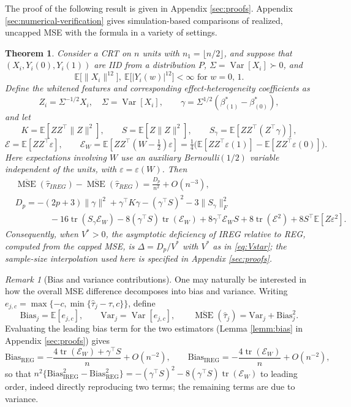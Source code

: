 \documentclass{article}
\newcommand{\EEE}{\mathbb{E}}
\newcommand{\Var}[1]{\operatorname{Var}\left[#1\right]}
\newcommand{\p}[1]{\left(#1\right)}
\newcommand{\htau}{\hat{\tau}}
\DeclareMathOperator{\tr}{tr}
\newcommand{\IREG}{\mathrm{IREG}}
\newcommand{\REG}{\mathrm{REG}}
\theoremstyle{plain}
\newtheorem{theo}[prop]{Theorem}
\theoremstyle{definition}
\theoremstyle{remark}
\newtheorem{rema}[prop]{Remark}
\begin{document}
The proof of the following result is given in Appendix \ref{sec:proofs}. Appendix \ref{sec:numerical-verification} gives simulation-based comparisons of realized, uncapped MSE with the formula in a variety of settings.

\begin{theo}
\label{theo:deficiency}
Consider a CRT on $n$ units with $n_1 = \lfloor n/2\rfloor$, and suppose that
$(X_i, Y_i(0), Y_i(1))$ are IID from a distribution $P$, $\Sigma = \Var{X_i} \succ 0$, and
\[
\EEE\big[\|X_i\|^{12}\big], \ \EEE\big[|Y_i(w)|^{12}\big] < \infty \text{ for } w = 0, \, 1.
\]
Define the whitened features and corresponding effect-heterogeneity coefficients as
\begin{equation}
\label{eq:whitening}
Z_i = \Sigma^{-1/2}X_i, \quad \Sigma = \Var{X_i},
\qquad
\gamma = \Sigma^{1/2}\p{\beta^*_{(1)}-\beta^*_{(0)}},
\end{equation}
and let
\[
K=\EEE[ZZ^\top\|Z\|^2],\qquad
S=\EEE[Z\|Z\|^2],\qquad
S_\gamma=\EEE[ZZ^\top(Z^\top\gamma)],
\]
\[
\mathcal E=\EEE[ZZ^\top\varepsilon],
\qquad
\mathcal E_{W}=\EEE[ZZ^\top(W-\tfrac12)\varepsilon] = \tfrac14\big(\EEE[ZZ^\top\varepsilon(1)]-\EEE[ZZ^\top\varepsilon(0)]\big).
\]
Here expectations involving $W$ use an auxiliary Bernoulli$(1/2)$ variable independent of the units, with $\varepsilon=\varepsilon(W)$. Then
\begin{equation}
\begin{split}
\label{eq:Dp_general}
&\overline{\operatorname{MSE}}\p{\htau_{IREG}}-\overline{\operatorname{MSE}}\p{\htau_{REG}} = \frac{D_p}{n^2}+O(n^{-3}), \\
&D_p
=
-(2p+3)\|\gamma\|^2
+\gamma^\top K\gamma
-(\gamma^\top S)^2
-3\|S_\gamma\|_F^2\\
&\quad\quad\quad\quad-16\tr(S_\gamma \mathcal E_W)
-8(\gamma^\top S)\tr(\mathcal E_W)
+8\gamma^\top \mathcal E_WS
+8\tr(\mathcal E^2)+8S^\top \EEE[Z\varepsilon^2].
\end{split}
\end{equation}
Consequently, when $V^*>0$, the asymptotic deficiency of IREG relative to REG, computed from the capped MSE, is $\Delta = D_p/V^*$ with $V^*$ as in \eqref{eq:Vstar}; the sample-size interpolation used here is specified in Appendix \ref{sec:proofs}.
\end{theo}

\begin{rema}[Bias and variance contributions]
\label{rema:bias}
One may naturally be interested in how the overall MSE difference decomposes into bias and variance. Writing $e_{j,c}=\max\{-c,\min\{\htau_j-\tau,c\}\}$, define
\[
\mathrm{Bias}_j=\EEE[e_{j,c}],
\qquad
\mathrm{Var}_j=\Var{e_{j,c}},
\qquad
\overline{\operatorname{MSE}}(\htau_j)=\mathrm{Var}_j+\mathrm{Bias}_j^2.
\]
Evaluating the leading bias term for the two estimators (Lemma \ref{lemm:bias} in Appendix \ref{sec:proofs}) gives
\[
\mathrm{Bias}_{\REG}
= -\frac{4\tr(\mathcal E_W)+\gamma^\top S}{n}+O(n^{-2}),
\qquad
\mathrm{Bias}_{\IREG}
= -\frac{4\tr(\mathcal E_W)}{n}+O(n^{-2}),
\]
so that
$n^2\{\mathrm{Bias}^2_{\IREG}-\mathrm{Bias}^2_{\REG}\}
=-(\gamma^\top S)^2-8(\gamma^\top S)\tr(\mathcal E_W)$
to leading order, indeed directly reproducing two terms;
the remaining terms are due to variance.
\end{rema}
\end{document}
